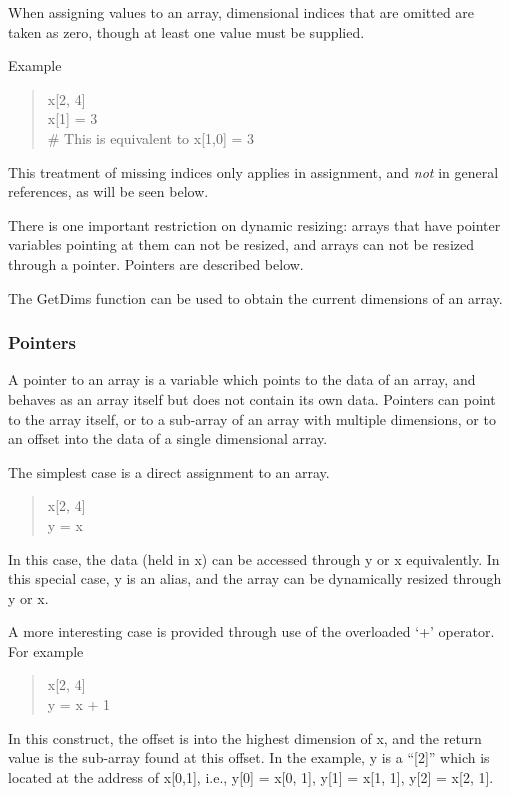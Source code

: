 When assigning values to an array, dimensional indices that are
omitted are taken as zero, though at least one value must be supplied.

Example
\begin{quote}\vt
x[2, 4]\\
x[1] = 3\\
\# This is equivalent to x[1,0] = 3
\end{quote}

This treatment of missing indices only applies in assignment, and {\it
not} in general references, as will be seen below.

There is one important restriction on dynamic resizing:  arrays that
have pointer variables pointing at them can not be resized, and arrays
can not be resized through a pointer.  Pointers are described below.

The {\vt GetDims} function can be used to obtain the current
dimensions of an array.

\subsubsection{Pointers}

A pointer to an array is a variable which points to the data of an
array, and behaves as an array itself but does not contain its own
data.  Pointers can point to the array itself, or to a sub-array of an
array with multiple dimensions, or to an offset into the data of a
single dimensional array. 
 
The simplest case is a direct assignment to an array.
\begin{quote}\vt
x[2, 4]\\
y = x
\end{quote}

In this case, the data (held in {\vt x}) can be accessed through {\vt
y} or {\vt x} equivalently.  In this special case, {\vt y} is an
alias, and the array can be dynamically resized through {\vt y} or
{\vt x}.

A more interesting case is provided through use of the overloaded
`{\vt +}' operator.  For example
\begin{quote}\vt
x[2, 4]\\
y = x + 1
\end{quote}

In this construct, the offset is into the highest dimension of {\vt
x}, and the return value is the sub-array found at this offset.  In
the example, {\vt y} is a ``[2]'' which is located at the address of
{\vt x[0,1]}, i.e., {\vt y[0] = x[0, 1]}, {\vt y[1] = x[1, 1]}, {\vt
y[2] = x[2, 1]}.

